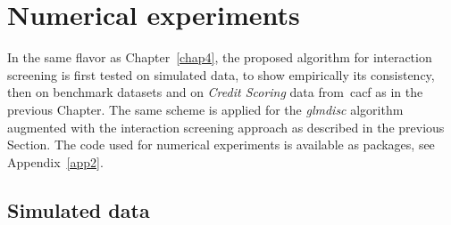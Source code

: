 \section{Numerical experiments}

In the same flavor as Chapter~\ref{chap4}, the proposed algorithm for interaction screening is first tested on simulated data, to show empirically its consistency, then on benchmark datasets and on \textit{Credit Scoring} data from~\gls{cacf} as in the previous Chapter. The same scheme is applied for the \textit{glmdisc} algorithm augmented with the interaction screening approach as described in the previous Section.
The code used for numerical experiments is available as packages, see Appendix~\ref{app2}.

\subsection{Simulated data}

